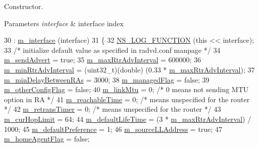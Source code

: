 Constructor. 


\begin{DoxyParams}{Parameters}
{\em interface} & interface index \\
\hline
\end{DoxyParams}

\begin{DoxyCode}
30   : \hyperlink{classns3_1_1RadvdInterface_abbff31a8371255eb386544f23a1838b2}{m\_interface} (interface)
31 \{
32   \hyperlink{log-macros-disabled_8h_a90b90d5bad1f39cb1b64923ea94c0761}{NS\_LOG\_FUNCTION} (\textcolor{keyword}{this} << interface);
33   \textcolor{comment}{/* initialize default value as specified in radvd.conf manpage */}
34   \hyperlink{classns3_1_1RadvdInterface_a59d1c4bd832e86bbad853fed0c334bb4}{m\_sendAdvert} = \textcolor{keyword}{true};
35   \hyperlink{classns3_1_1RadvdInterface_a53bc442035e24d25f34f8c0a8cd20db6}{m\_maxRtrAdvInterval} = 600000;
36   \hyperlink{classns3_1_1RadvdInterface_ad98b9173e0f124d93265d6e141feaac1}{m\_minRtrAdvInterval} = (uint32\_t)(\textcolor{keywordtype}{double}) (0.33 * 
      \hyperlink{classns3_1_1RadvdInterface_a53bc442035e24d25f34f8c0a8cd20db6}{m\_maxRtrAdvInterval});
37   \hyperlink{classns3_1_1RadvdInterface_ad4a9e81800501a6d88444c7ca207a9f3}{m\_minDelayBetweenRAs} = 3000;
38   \hyperlink{classns3_1_1RadvdInterface_a963e57a2f2a860c82e9ecab0c9f273ec}{m\_managedFlag} = \textcolor{keyword}{false};
39   \hyperlink{classns3_1_1RadvdInterface_a79d80eab87a65685723abd069bfb1a2e}{m\_otherConfigFlag} = \textcolor{keyword}{false};
40   \hyperlink{classns3_1_1RadvdInterface_af5697655181c68cd0617ddd1724dd7a5}{m\_linkMtu} = 0; \textcolor{comment}{/* 0 means not sending MTU option in RA */}
41   \hyperlink{classns3_1_1RadvdInterface_a2545ba2a8e79e1fa0ffdc153011b8d20}{m\_reachableTime} = 0; \textcolor{comment}{/* means unspecified for the router */}
42   \hyperlink{classns3_1_1RadvdInterface_a7d4c8887ded7cf251aae36e9061965f0}{m\_retransTimer} = 0; \textcolor{comment}{/* means unspecified for the router */}
43   \hyperlink{classns3_1_1RadvdInterface_ad6f1a73f0e78b7f57c935b1ccffc5adc}{m\_curHopLimit} = 64;
44   \hyperlink{classns3_1_1RadvdInterface_a30cef69bc3ca9c49d5768dc6e4f25006}{m\_defaultLifeTime} = (3 * \hyperlink{classns3_1_1RadvdInterface_a53bc442035e24d25f34f8c0a8cd20db6}{m\_maxRtrAdvInterval}) / 1000;
45   \hyperlink{classns3_1_1RadvdInterface_a5e5b744252884bfda1b660fbe84acd6a}{m\_defaultPreference} = 1;
46   \hyperlink{classns3_1_1RadvdInterface_a56f94e906d5f7164011d25642f276366}{m\_sourceLLAddress} = \textcolor{keyword}{true};
47   \hyperlink{classns3_1_1RadvdInterface_abd286a6408ad7936f6241eabd13379be}{m\_homeAgentFlag} = \textcolor{keyword}{false};

\end{DoxyCode}
